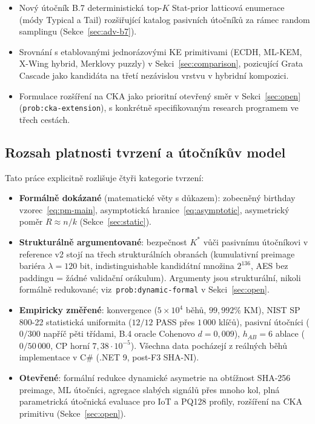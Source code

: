 \documentclass[11pt,a4paper]{article}
\begin{document}
\begin{itemize}[leftmargin=*]
\item Nový útočník B.7 deterministická top-$K$ Stat-prior latticová enumerace (módy Typical a Tail) rozšiřující katalog pasivních útočníků za rámec random samplingu (Sekce~\ref{sec:adv-b7}).
\item Srovnání s etablovanými jednorázovými KE primitivami (ECDH, ML-KEM, X-Wing hybrid, Merklovy puzzly) v Sekci~\ref{sec:comparison}, pozicující Grata Cascade jako kandidáta na třetí nezávislou vrstvu v hybridní kompozici.
\item Formulace rozšíření na CKA jako prioritní otevřený směr v Sekci~\ref{sec:open} (\texttt{prob:cka-extension}), s konkrétně specifikovaným research programem ve třech cestách.
\end{itemize}

\subsection{Rozsah platnosti tvrzení a útočníkův model}\label{sec:scope}

Tato práce explicitně rozlišuje čtyři kategorie tvrzení:
\begin{itemize}[leftmargin=*]
\item \textbf{Formálně dokázané} (matematické věty s důkazem): zobecněný birthday vzorec~\eqref{eq:pm-main}, asymptotická hranice~\eqref{eq:asymptotic}, asymetrický poměr $R \approx n/k$ (Sekce~\ref{sec:static}).
\item \textbf{Strukturálně argumentované}: bezpečnost $K^*$ vůči pasivnímu útočníkovi v reference v2 stojí na třech strukturálních obranách (kumulativní preimage bariéra $\lambda = 120$ bit, indistinguishable kandidátní množina $2^{136}$, AES bez paddingu = žádné validační orákulum). Argumenty jsou strukturální, nikoli formálně redukované; viz~\texttt{prob:dynamic-formal} v Sekci~\ref{sec:open}.
\item \textbf{Empiricky změřené}: konvergence ($5 \times 10^4$ běhů, $99{,}992\%$ KM), NIST SP 800-22 statistická uniformita ($12/12$ PASS přes $1\,000$ klíčů), pasivní útočníci ($0/300$ napříč pěti třídami, B.4 oracle Cohenovo $d = 0{,}009$), $h_{AB} = 6$ ablace ($0/50\,000$, CP horní $7{,}38 \cdot 10^{-5}$). Všechna data pocházejí z reálných běhů implementace v C\# (.NET 9, post-F3 SHA-NI).
\item \textbf{Otevřené}: formální redukce dynamické asymetrie na obtížnost SHA-256 preimage, ML útočníci, agregace slabých signálů přes mnoho kol, plná parametrická útočnická evaluace pro IoT a PQ128 profily, rozšíření na CKA primitivu (Sekce~\ref{sec:open}).
\end{itemize}
\end{document}
